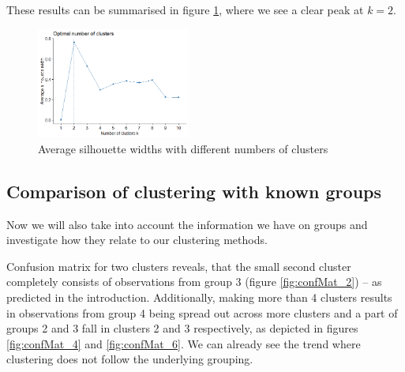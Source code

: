 \documentclass[12pt]{article}
\begin{document}
These results can be summarised in figure \ref{fig:optNumber}, where we see a clear peak at $k=2.$
\begin{figure}
  \begin{center}
    \includegraphics[width = 0.45\textwidth]{../images/project2/number_of_clusters.png}
    \caption{Average silhouette widths with different numbers of clusters}
    \label{fig:optNumber}
  \end{center}
\end{figure}

\subsection{Comparison of clustering with known groups}

Now we will also take into account the information we have on groups and investigate how they relate to our clustering methods. 

Confusion matrix for two clusters reveals, that the small second cluster completely consists of observations from group 3 (figure \ref{fig:confMat_2}) -- as predicted in the introduction. Additionally, making
more than 4 clusters results in observations from group 4 being spread out across more clusters and a part of groups 2 and 3 fall in clusters 2 and 3 respectively, as depicted in figures \ref{fig:confMat_4} and \ref{fig:confMat_6}.
We can already see the trend where clustering does not follow the underlying grouping.
\end{document}
